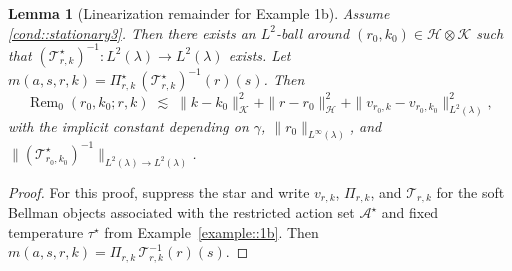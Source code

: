 \documentclass[11pt]{article}
\theoremstyle{plain}
\newtheorem{lemma}[theorem]{Lemma}
\begin{document}
 
\begin{lemma}[Linearization remainder for Example 1b]
\label{lemma::linearizationExamplestar}
Assume \ref{cond::stationary3}. Then there exists an $L^2$-ball around $(r_0,k_0) \in \mathcal{H} \otimes \mathcal{K}$ such that $(\mathcal{T}_{r,k}^\star)^{-1}: L^2(\lambda) \to L^2(\lambda)$ exists. Let $m(a,s,r,k) = \Pi_{r,k}^\star\,(\mathcal{T}_{r,k}^\star)^{-1}(r)(s)$.  
Then
\[
\operatorname{Rem}_0(r_0,k_0; r,k) \;\lesssim\; \|k - k_0\|_{\mathcal{K}}^{2} 
+ \|r - r_0\|_{\mathcal{H}}^{2} 
+ \|v_{r_0,k}-v_{r_0,k_0}\|_{L^2(\lambda)}^{2},
\]
with the implicit constant depending on $\gamma$, $\|r_0\|_{L^\infty(\lambda)}$, and $\|(\mathcal{T}_{r_0,k_0}^\star)^{-1}\|_{L^2(\lambda)\to L^2(\lambda)}$.
\end{lemma}
\begin{proof}
For this proof, suppress the star and write $v_{r,k}$, $\Pi_{r,k}$, and $\mathcal{T}_{r,k}$ for the soft Bellman objects associated with the restricted action set $\mathcal{A}^\star$ and fixed temperature $\tau^\star$ from Example~\ref{example::1b}. Then $m(a,s,r,k) = \Pi_{r,k}\,\mathcal{T}_{r,k}^{-1}(r)(s)$.


\end{proof}
\end{document}
